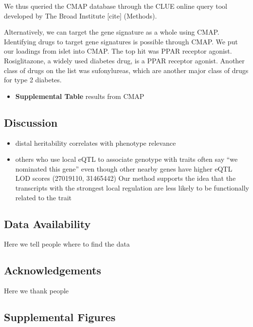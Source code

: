 \documentclass[
]{article}
\providecommand{\tightlist}{%
  \setlength{\itemsep}{0pt}\setlength{\parskip}{0pt}}
\begin{document}
We thus queried the CMAP database through the CLUE online query tool
developed by The Broad Institute {[}cite{]} (Methods).

Alternatively, we can target the gene signature as a whole using CMAP.
Identifying drugs to target gene signatures is possible through CMAP. We
put our loadings from islet into CMAP. The top hit was PPAR receptor
agonist. Rosiglitazone, a widely used diabetes drug, is a PPAR receptor
agonist. Another class of drugs on the list was sufonylureas, which are
another major class of drugs for type 2 diabetes.

\begin{itemize}
\tightlist
\item
  \textbf{Supplemental Table} results from CMAP
\end{itemize}

\subsection{Discussion}\label{discussion}

\begin{itemize}
\item
  distal heritability correlates with phenotype relevance
\item
  others who use local eQTL to associate genotype with traits often say
  ``we nominated this gene'' even though other nearby genes have higher
  eQTL LOD scores (27019110, 31465442) Our method supports the idea that
  the transcripts with the strongest local regulation are less likely to
  be functionally related to the trait
\end{itemize}

\subsection{Data Availability}\label{data-availability}

Here we tell people where to find the data

\subsection{Acknowledgements}\label{acknowledgements}

Here we thank people

\pagebreak

\subsection{Supplemental Figures}\label{supplemental-figures}
\end{document}
